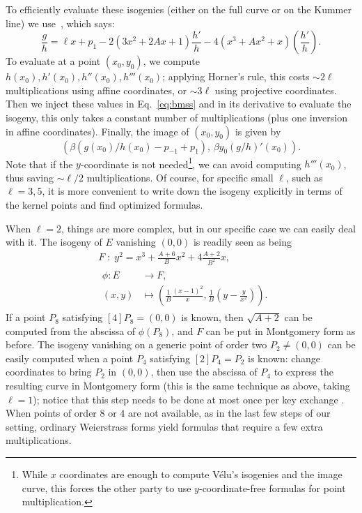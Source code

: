 \documentclass[envcountsect,envcountsame,runningheads]{llncs}   %
\begin{document}
To efficiently evaluate these isogenies (either on the full curve or
on the Kummer line) we use~\cite[Proposition~4.1]{Bostan}, which says:
\begin{equation}
  \label{eq:bmss}
  \frac{g}{h} = \ell x + p_1 - 2(3x^2+2Ax+1)\frac{h'}{h} - 4(x^3+Ax^2+x)\left(\frac{h'}{h}\right).
\end{equation}
To evaluate at a point $(x_0,y_0)$, we compute $h(x_0), h'(x_0),
h''(x_0), h'''(x_0)$; applying Horner's rule, this costs $\sim 2\ell$
multiplications using affine coordinates, or $\sim 3\ell$ using
projective coordinates. Then we inject these values in
Eq.~\eqref{eq:bmss} and in its derivative to evaluate the isogeny,
this only takes a constant number of multiplications (plus one
inversion in affine coordinates). Finally, the image of $(x_0,y_0)$ is
given by \[\left(\beta(g(x_0)/h(x_0)-p_{-1}+p_1),\, \beta
y_0(g/h)'(x_0)\right).\] Note that if the $y$-coordinate is not
needed\footnote{While $x$ coordinates are enough to compute V\'elu's
  isogenies and the image curve, this forces the other party to use
  $y$-coordinate-free formulas for point multiplication.}, we can
avoid computing $h'''(x_0)$, thus saving $\sim\ell/2$
multiplications. Of course, for specific small $\ell$, such as
$\ell=3,5$, it is more convenient to write down the isogeny explicitly
in terms of the kernel points and find optimized formulas.

When $\ell=2$, things are more complex, but in our specific case we
can easily deal with it. The isogeny of $E$ vanishing
$(0,0)$ is readily seen as being
\begin{align}
  \label{eq:isogeny-2}
  &F \;:\;  y^2 = x^3 + \frac{A+6}{B}x^2 + 4\frac{A+2}{B^2}x,\\
  &\begin{aligned}
    \phi : E &\to F,\\
    (x,y) &\mapsto \left(\frac{1}{B}\frac{(x-1)^2}{x}, \frac{1}{B}\left(y - \frac{y}{x^2}\right)\right).
  \end{aligned}
\end{align}
If a point $P_8$ satisfying $[4]P_8=(0,0)$ is known, then $\sqrt{A+2}$
can be computed from the abscissa of $\phi(P_8)$, and $F$ can be put
in Montgomery form as before. The isogeny vanishing on a generic point
of order two $P_2\ne(0,0)$ can be easily computed when a point $P_4$
satisfying $[2]P_4=P_2$ is known: change coordinates to bring $P_2$ in
$(0,0)$, then use the abscissa of $P_4$ to express the resulting curve
in Montgomery form (this is the same technique as above, taking
$\ell=1$); notice that this step needs to be done at most once per key
exchange . When points of order $8$ or $4$ are not available, as in
the last few steps of our setting, ordinary Weierstrass forms yield
formulas that require a few extra multiplications.
\end{document}
